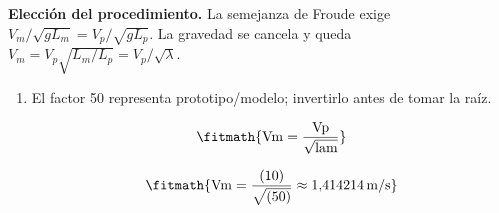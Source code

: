 \noindent\textbf{Elección del procedimiento.} La semejanza de Froude exige $V_m/\sqrt{gL_m}=V_p/\sqrt{gL_p}$. La gravedad se cancela y queda $V_m=V_p\sqrt{L_m/L_p}=V_p/\sqrt{\lambda}$.

\begin{enumerate}

\item El factor 50 representa prototipo/modelo; invertirlo antes de tomar la raíz.

\[\fitmath{\mathrm{Vm}=\frac{\mathrm{Vp}}{\sqrt{\mathrm{lam}}}}\]

\[\fitmath{\mathrm{Vm}=\frac{(10)}{\sqrt{(50)}}\approx 1{,}414214\,\mathrm{m/s}}\]

\end{enumerate}
